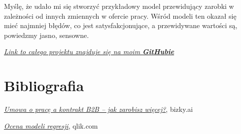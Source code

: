 \documentclass[a4paper]{article}
\begin{document}
\quad Myślę, że udało mi się stworzyć przykładowy model przewidujący zarobki w zależności od innych
zmiennych w ofercie pracy. Wśród modeli ten okazał się mieć najmniej błędów, co jest
satysfakcjonujące, a przewidywane wartości są, powiedzmy jasno, sensowne.\\

\begin{center}
    \href{https://github.com/lukaszfabia/RaportIT}{\textit{Link to całego projektu znajduje się na moim \textbf{GitHubie}}}
\end{center}


\section{Bibliografia}

\begin{thebibliography}{9}
    \href{https://bizky.ai/blog/umowa-o-prace-a-kontrakt-b2b-co-sie-bardziej-oplaca/}{\textit{Umowa o pracę a kontrakt B2B – jak zarobisz więcej?}}, bizky.ai

    \href{https://help.qlik.com/pl-PL/cloud-services/Subsystems/Hub/Content/Sense_Hub/AutoML/scoring-regression.htm}{\textit{Ocena modeli regresji}}, qlik.com
\end{thebibliography}
\end{document}
